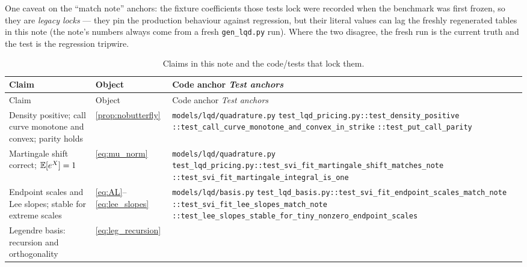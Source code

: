 \documentclass[11pt]{article}
\begin{document}
One caveat on the ``match note'' anchors: the fixture coefficients those tests
lock were recorded when the benchmark was first frozen, so they are
\emph{legacy locks} --- they pin the production behaviour against regression,
but their literal values can lag the freshly regenerated tables in this note
(the note's numbers always come from a fresh \texttt{gen\_lqd.py} run). Where
the two disagree, the fresh run is the current truth and the test is the
regression tripwire.

\begingroup
\small
\setlength{\tabcolsep}{4pt}
\renewcommand{\arraystretch}{1.15}
\begin{longtable}{@{}p{}p{}p{}@{}}
\caption{Claims in this note and the code/tests that lock them.}\\
\toprule Claim & Object & Code anchor \newline \emph{Test anchors}\\ \midrule
\endfirsthead
\toprule Claim & Object & Code anchor \newline \emph{Test anchors}\\ \midrule
\endhead
Density positive; call curve monotone and convex; parity holds &
\cref{prop:nobutterfly} &
\nolinkurl{models/lqd/quadrature.py}\newline
\nolinkurl{test_lqd_pricing.py::test_density_positive}\newline
\nolinkurl{::test_call_curve_monotone_and_convex_in_strike}\newline
\nolinkurl{::test_put_call_parity}\\
\addlinespace
Martingale shift correct; $\mathbb{E}[e^X]=1$ &
\eqref{eq:mu_norm} &
\nolinkurl{models/lqd/quadrature.py}\newline
\nolinkurl{test_lqd_pricing.py::test_svi_fit_martingale_shift_matches_note}\newline
\nolinkurl{::test_svi_fit_martingale_integral_is_one}\\
\addlinespace
Endpoint scales and Lee slopes; stable for extreme scales &
\eqref{eq:AL}--\eqref{eq:lee_slopes} &
\nolinkurl{models/lqd/basis.py}\newline
\nolinkurl{test_lqd_basis.py::test_svi_fit_endpoint_scales_match_note}\newline
\nolinkurl{::test_svi_fit_lee_slopes_match_note}\newline
\nolinkurl{::test_lee_slopes_stable_for_tiny_nonzero_endpoint_scales}\\
\addlinespace
Legendre basis: recursion and orthogonality &
\eqref{eq:leg_recursion} &

\end{longtable}
\end{document}
